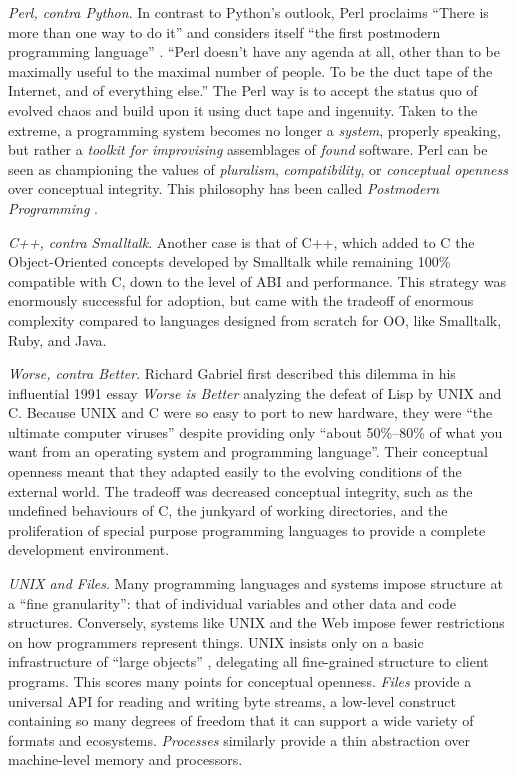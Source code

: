 \documentclass[english,submission]{programming}
\begin{document}
\emph{Perl, contra Python}. In contrast to Python's outlook, Perl
proclaims ``There is more than one way to do it'' and considers itself
``the first postmodern programming language'' \cite{Perl}. ``Perl
doesn't have any agenda at all, other than to be maximally useful to the
maximal number of people. To be the duct tape of the Internet, and of
everything else.'' The Perl way is to accept the status quo of evolved
chaos and build upon it using duct tape and ingenuity. Taken to the
extreme, a programming system becomes no longer a \emph{system},
properly speaking, but rather a \emph{toolkit for improvising}
assemblages of \emph{found} software. Perl can be seen as championing
the values of \emph{pluralism}, \emph{compatibility}, or
\emph{conceptual openness} over conceptual integrity. This philosophy
has been called \emph{Postmodern Programming} \cite{PoMoProNotes}.

\emph{C++, contra Smalltalk}. Another case is that of C++, which added
to C the Object-Oriented concepts developed by Smalltalk while remaining
100\% compatible with C, down to the level of ABI and performance. This
strategy was enormously successful for adoption, but came with the
tradeoff of enormous complexity compared to languages designed from
scratch for OO, like Smalltalk, Ruby, and Java.

\emph{Worse, contra Better}. Richard Gabriel first described this
dilemma in his influential 1991 essay \emph{Worse is Better} \cite{WIB}
analyzing the defeat of Lisp by UNIX and C. Because UNIX and C were so
easy to port to new hardware, they were ``the ultimate computer
viruses'' despite providing only ``about 50\%--80\% of what you want
from an operating system and programming language''. Their conceptual
openness meant that they adapted easily to the evolving conditions of
the external world. The tradeoff was decreased conceptual integrity,
such as the undefined behaviours of C, the junkyard of working
directories, and the proliferation of special purpose programming
languages to provide a complete development environment.


\emph{UNIX and Files}. Many programming languages and systems impose
structure at a ``fine granularity'': that of individual variables and
other data and code structures. Conversely, systems like UNIX and the
Web impose fewer restrictions on how programmers represent things. UNIX
insists only on a basic infrastructure of ``large objects''
\cite{KellOS}, delegating all fine-grained structure to client programs.
This scores many points for conceptual openness. \emph{Files} provide a
universal API for reading and writing byte streams, a low-level
construct containing so many degrees of freedom that it can support a
wide variety of formats and ecosystems. \emph{Processes} similarly
provide a thin abstraction over machine-level memory and processors.
\end{document}
